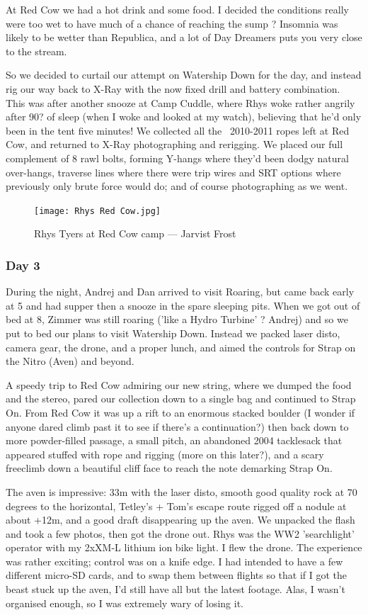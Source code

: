 \documentclass[onecolumn]{book}
\begin{document}
At Red Cow we had a hot drink and some food. I decided the conditions really were too wet to have much of a chance of reaching the sump ? Insomnia was likely to be wetter than Republica, and a lot of Day Dreamers puts you very close to the stream.

So we decided to curtail our attempt on Watership Down for the day, and instead rig our way back to X-Ray with the now fixed drill and battery combination. This was after another snooze at Camp Cuddle, where Rhys woke rather angrily after 90? of sleep (when I woke and looked at my watch), believing that he'd only been in the tent five minutes!
We collected all the ~2010-2011 ropes left at Red Cow, and returned to X-Ray photographing and rerigging. We placed our full complement of 8 rawl bolts, forming Y-hangs where they'd been dodgy natural over-hangs, traverse lines where there were trip wires and SRT options where previously only brute force would do; and of course photographing as we went.


\begin{figure}[h]
\centering
\texttt{[image: Rhys Red Cow.jpg]}
\caption{Rhys Tyers at Red Cow camp --- Jarvist Frost}
\label{rhys red cow}
\end{figure}


\subsubsection{Day 3}
During the night, Andrej and Dan arrived to visit Roaring, but came back early at 5 and had supper then a snooze in the spare sleeping pits. When we got out of bed at 8, Zimmer was still roaring ('like a Hydro Turbine' ? Andrej) and so we put to bed our plans to visit Watership Down. Instead we packed laser disto, camera gear, the drone, and a proper lunch, and aimed the controls for Strap on the Nitro (Aven) and beyond.

A speedy trip to Red Cow admiring our new string, where we dumped the food and the stereo, pared our collection down to a single bag and continued to Strap On.
From Red Cow it was up a rift to an enormous stacked boulder (I wonder if anyone dared climb past it to see if there's a continuation?) then back down to more powder-filled passage, a small pitch, an abandoned 2004 tacklesack that appeared stuffed with rope and rigging (more on this later?), and a scary freeclimb down a beautiful cliff face to reach the note demarking Strap On.

The aven is impressive: 33m with the laser disto, smooth good quality rock at 70 degrees to the horizontal, Tetley's + Tom's escape route rigged off a nodule at about +12m, and a good draft disappearing up the aven.
We unpacked the flash and took a few photos, then got the drone out. Rhys was the WW2 'searchlight' operator with my 2xXM-L lithium ion bike light. I flew the drone.
The experience was rather exciting; control was on a knife edge. I had intended to have a few different micro-SD cards, and to swap them between flights so that if I got the beast stuck up the aven, I'd still have all but the latest footage. Alas, I wasn't organised enough, so I was extremely wary of losing it.
\end{document}
